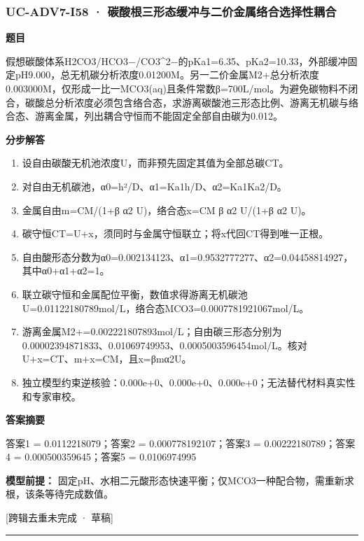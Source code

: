 \documentclass[UTF8,11pt,a4paper]{ctexart}
\begin{document}
\subsubsection*{UC-ADV7-I58 · 碳酸根三形态缓冲与二价金属络合选择性耦合}
\noindent\textbf{题目}\par
假想碳酸体系H2CO3/HCO3−/CO3\textasciicircum{}2−的pKa1=6.35、pKa2=10.33，外部缓冲固定pH9.000，总无机碳分析浓度0.01200M。另一二价金属M2+总分析浓度0.003000M，仅形成一比一MCO3(aq)且条件常数β=700L/mol。为避免碳物料不闭合，碳酸总分析浓度必须包含络合态，求游离碳酸池三形态比例、游离无机碳与络合态、游离金属，列出耦合守恒而不能固定全部自由碳为0.012。\par
\medskip\noindent\textbf{分步解答}
\begin{enumerate}
\item 设自由碳酸无机池浓度U，而非预先固定其值为全部总碳CT。
\item 对自由无机碳池，α0=h²/D、α1=Ka1h/D、α2=Ka1Ka2/D。
\item 金属自由m=CM/(1+β α2 U)，络合态x=CM β α2 U/(1+β α2 U)。
\item 碳守恒CT=U+x，须同时与金属守恒联立；将x代回CT得到唯一正根。
\item 自由酸形态分数为α0=0.002134123、α1=0.9532777277、α2=0.04458814927，其中α0+α1+α2=1。
\item 联立碳守恒和金属配位平衡，数值求得游离无机碳池U=0.01122180789mol/L，络合态MCO3=0.0007781921067mol/L。
\item 游离金属M2+=0.002221807893mol/L；自由碳三形态分别为0.00002394871833、0.01069749953、0.0005003596454mol/L。核对U+x=CT、m+x=CM，且x=βmα2U。
\item 独立模型约束逆核验：0.000e+0、0.000e+0、0.000e+0；无法替代材料真实性和专家审校。
\end{enumerate}
\noindent\textbf{答案摘要}\par
答案1 = 0.0112218079；答案2 = 0.000778192107；答案3 = 0.00222180789；答案4 = 0.000500359645；答案5 = 0.0106974995\par
\noindent\textbf{模型前提：}
固定pH、水相二元酸形态快速平衡；仅MCO3一种配合物，需重新求根，该条等待完成数值。\par
\noindent\textcolor{red!65!black}{[跨辑去重未完成 · 草稿]} \par
\medskip\hrule\medskip
{}
\end{document}
